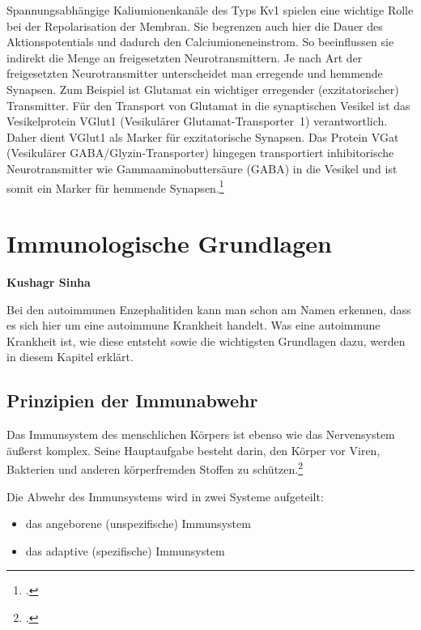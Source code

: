 \documentclass[a4paper, 12pt]{scrreprt}
\begin{document}
        Spannungsabhängige Kaliumionenkanäle des Typs Kv1 spielen eine wichtige
        Rolle bei der Repolarisation der Membran. Sie begrenzen auch hier die
        Dauer des Aktionspotentials und dadurch den Calciumioneneinstrom. So
        beeinflussen sie indirekt die Menge an freigesetzten Neurotransmittern.
        Je nach Art der freigesetzten Neurotransmitter unterscheidet man
        erregende und hemmende Synapsen. Zum Beispiel ist Glutamat ein wichtiger
        erregender (exzitatorischer) Transmitter. Für den Transport von Glutamat
        in die synaptischen Vesikel ist das Vesikelprotein VGlut1 (Vesikulärer
        Glutamat-Transporter~1) verantwortlich. Daher dient VGlut1 als Marker
        für exzitatorische Synapsen. Das Protein VGat (Vesikulärer
        GABA/Glyzin-Transporter) hingegen transportiert inhibitorische
        Neurotransmitter wie Gammaaminobuttersäure (GABA) in die Vesikel und ist
        somit ein Marker für hemmende
        Synapsen.\footcite[S.~1092]{Markl1997}


    \section{Immunologische Grundlagen}
    \textbf{Kushagr Sinha}
    
Bei den autoimmunen Enzephalitiden kann man schon am Namen erkennen, dass es sich hier um eine autoimmune Krankheit handelt. Was eine autoimmune Krankheit ist, wie diese entsteht sowie die wichtigsten Grundlagen dazu, werden in diesem Kapitel erklärt.

\subsection{Prinzipien der Immunabwehr}

Das Immunsystem des menschlichen Körpers ist ebenso wie das Nervensystem äußerst komplex. Seine Hauptaufgabe besteht darin, den Körper vor Viren, Bakterien und anderen körperfremden Stoffen zu schützen.\footcite{Smith1999}

Die Abwehr des Immunsystems wird in zwei Systeme aufgeteilt:
\begin{itemize}
	\item das angeborene (unspezifische) Immunsystem
	\item das adaptive (spezifische) Immunsystem
\end{itemize}
\end{document}
